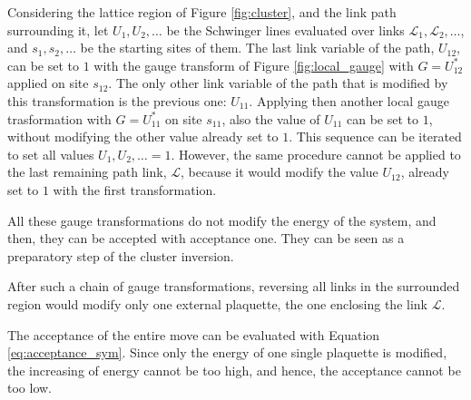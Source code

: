 Considering the lattice region of Figure \ref{fig:cluster}, and the link path surrounding it,
let $U_1, U_2, \ldots$ be the Schwinger lines evaluated over links $\mathcal L_1, \mathcal L_2, \ldots$,
and $s_1, s_2, \ldots$ be the starting sites of them.
The last link variable of the path, $U_{12}$, can be set to $1$ with the gauge transform of Figure \ref{fig:local_gauge}
with $G=U^*_{12}$ applied on site $s_{12}$.
The only other link variable of the path that is modified by this transformation is the previous one: $U_{11}$.
Applying then another local gauge trasformation with $G=U^*_{11}$ on site $s_{11}$,
also the value of $U_{11}$ can be set to $1$, without modifying the other value already set to $1$.
This sequence can be iterated to set all values $U_1,U_2,\ldots=1$.
However, the same procedure cannot be applied to the last remaining path link, $\mathcal L$,
because it would modify the value $U_{12}$, already set to $1$ with the first transformation.

All these gauge transformations do not modify the energy of the system,
and then, they can be accepted with acceptance one.
They can be seen as a preparatory step of the cluster inversion.

After such a chain of gauge transformations,
reversing all links in the surrounded region would modify only one external plaquette,
the one enclosing the link $\mathcal L$.

The acceptance of the entire move can be evaluated with Equation \eqref{eq:acceptance_sym}.
Since only the energy of one single plaquette is modified,
the increasing of energy cannot be too high, and hence, the acceptance cannot be too low.

